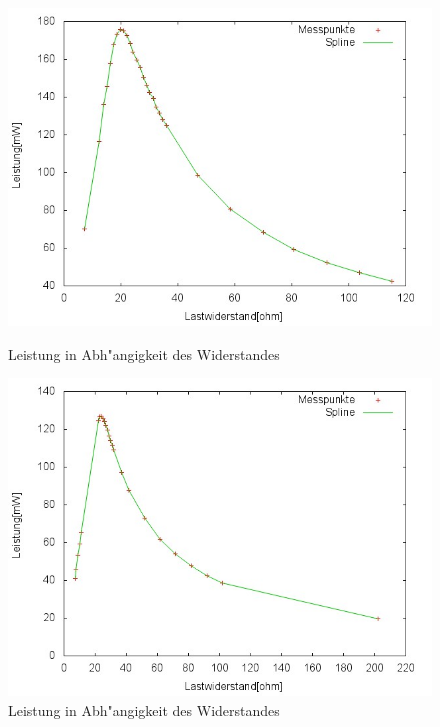 	\begin{figure}[htbp]
		\centering
		\includegraphics[width = 12cm]{img/290p.jpg}
		\caption{Leistung in Abh"angigkeit des Widerstandes}
		\label{PR1}

		\centering
		\includegraphics[width = 12cm]{img/367p.jpg}
		\caption{Leistung in Abh"angigkeit des Widerstandes}
		\label{PR2}
\end{figure}
